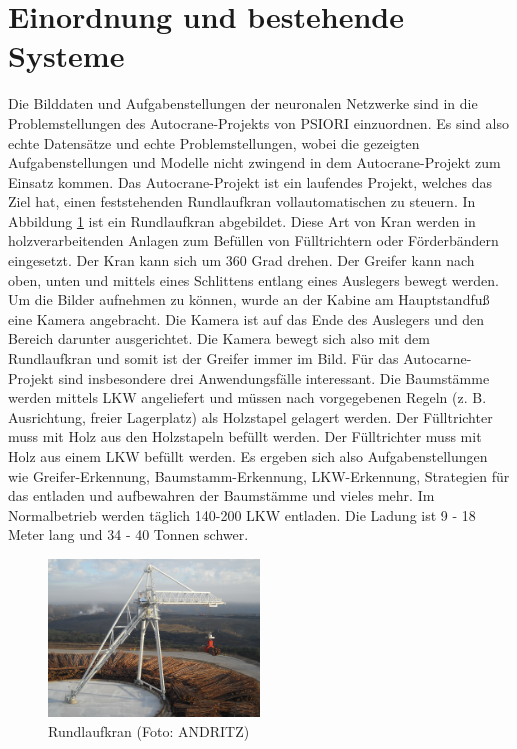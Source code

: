 	\section{Einordnung und bestehende Systeme}
	\label{sec:BestehendesSystem}
	Die Bilddaten und Aufgabenstellungen der neuronalen Netzwerke sind in die Problemstellungen des Autocrane-Projekts von PSIORI einzuordnen. Es sind also echte Datensätze und echte Problemstellungen, wobei die gezeigten Aufgabenstellungen und Modelle nicht zwingend in dem Autocrane-Projekt zum Einsatz kommen. Das Autocrane-Projekt ist ein laufendes Projekt, welches das Ziel hat, einen feststehenden Rundlaufkran vollautomatischen zu steuern. In Abbildung \ref{img:CircularCrane} ist ein Rundlaufkran abgebildet. Diese Art von Kran werden in holzverarbeitenden Anlagen zum Befüllen von Fülltrichtern oder Förderbändern eingesetzt. Der Kran kann sich um 360 Grad drehen. Der Greifer kann nach oben, unten und mittels eines Schlittens entlang eines Auslegers bewegt werden. Um die Bilder aufnehmen zu können, wurde an der Kabine am Hauptstandfuß eine Kamera angebracht. Die Kamera ist auf das Ende des Auslegers und den Bereich darunter ausgerichtet. Die Kamera bewegt sich also mit dem Rundlaufkran und somit ist der Greifer immer im Bild. Für das Autocarne-Projekt sind insbesondere drei Anwendungsfälle interessant. Die Baumstämme werden mittels LKW angeliefert und müssen nach vorgegebenen Regeln (z. B. Ausrichtung, freier Lagerplatz) als Holzstapel gelagert werden. Der Fülltrichter muss mit Holz aus den Holzstapeln befüllt werden. Der Fülltrichter muss mit Holz aus einem LKW befüllt werden. Es ergeben sich also Aufgabenstellungen wie Greifer-Erkennung, Baumstamm-Erkennung, LKW-Erkennung, Strategien für das entladen und aufbewahren der Baumstämme und vieles mehr. Im Normalbetrieb werden täglich 140-200 LKW entladen. Die Ladung ist 9 - 18 Meter lang und 34 - 40 Tonnen schwer. \cite{PSIORIGmbH.2020}
	\begin{figure}[h]
		\centering
		\includegraphics[width=0.5\textwidth, center]{bilder/Grundlagen/Kran_vollstaendig_N1_030.jpg}
		\caption[Rundlaufkran]{Rundlaufkran (Foto: ANDRITZ)}
		\label{img:CircularCrane}
	\end{figure}		

